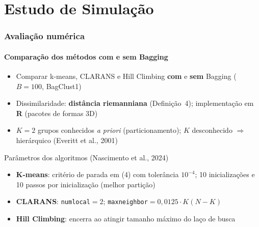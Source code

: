 \documentclass[brazilian,11pt]{beamer}
\begin{document}
\section[Simulação]{Estudo de Simulação}

\begin{frame}[shrink=5]
    \frametitle{Avaliação numérica}
    \framesubtitle{Comparação dos métodos com e sem Bagging}

    \begin{itemize}
        \item Comparar k-means, CLARANS e Hill Climbing \textbf{com} e \textbf{sem} Bagging ($B=100$, BagClust1)
        \item Dissimilaridade: \textbf{distância riemanniana} (Definição~4); implementação em \textbf{R} (pacotes de formas 3D)
        \item $K=2$ grupos conhecidos \textit{a priori} (particionamento); $K$ desconhecido $\Rightarrow$ hierárquico (Everitt et al., 2001)
    \end{itemize}

    \begin{block}{Parâmetros dos algoritmos (Nascimento et al., 2024)}
        \footnotesize
        \begin{itemize}
            \item \textbf{K-means}: critério de parada em (4) com tolerância $10^{-4}$; 10 inicializações e 10 passos por inicialização (melhor partição)
            \item \textbf{CLARANS}: \texttt{numlocal}$=2$; \texttt{maxneighbor}$=0{,}0125 \cdot K(N-K)$
            \item \textbf{Hill Climbing}: encerra ao atingir tamanho máximo do laço de busca
        \end{itemize}
    \end{block}
\end{frame}
\end{document}
